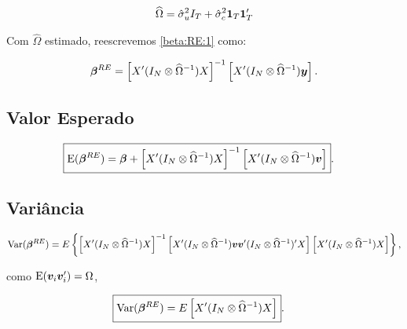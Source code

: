 \documentclass[11pt, oneside, a4paper, article]{article}
\numberwithin{equation}{section}
\begin{document}
\vspace{-1 em}
\begin{align*}
\widehat{\Omega}
= 
\hat{\sigma}^{2}_{u} I_{T} + \hat{\sigma}_{c}^{2} \boldsymbol{1}_{T} \boldsymbol{1}_{T}'
\end{align*}

Com $\widehat{\Omega}$ estimado, reescrevemos \eqref{beta:RE:1} como:

\vspace{-1 em}
\begin{align} \label{beta:RE:2}
\boldsymbol{\beta}^{RE} = 
\left[ X' (I_{N} \otimes \widehat{\Omega}^{-1}) X \right]^{-1}
\left[ X' (I_{N} \otimes \widehat{\Omega}^{-1}) \boldsymbol{y} \right].
\end{align}


\subsection*{Valor Esperado}

\vspace{-1 em}
\begin{align*}
	\Aboxed{
\E( \mbs{\beta}^{RE} ) = 
\mbs{\beta} +
\left[ X' (I_{N} \otimes \widehat{\Omega}^{-1}) X \right]^{-1}
\left[ X' (I_{N} \otimes \widehat{\Omega}^{-1}) \mbs{v} \right] }.
\end{align*}

\subsection*{Variância}

\vspace{-1 em}
\begin{align*} 
\text{Var}( \boldsymbol{\beta}^{RE} ) = 
E
\left\{ 
\left[ X' ( I_{N} \otimes \widehat{\Omega}^{-1} ) X \right]^{-1}
\left[
X' ( I_{N} \otimes \widehat{\Omega}^{-1} )
\boldsymbol{v} \boldsymbol{v}'
( I_{N} \otimes \widehat{\Omega}^{-1} )' X
\right]
\left[ X' ( I_{N} \otimes \widehat{\Omega}^{-1} ) X \right]
\right\},
\end{align*}

\noindent
como $\text{E}( \boldsymbol{v}_{i} \boldsymbol{v}_{i}' ) =\Omega$,

\vspace{-1 em}
\begin{align*} 
	\Aboxed{
\Var( \mbs{\beta}^{RE} ) = 
E
\left[ X' ( I_{N} \otimes \widehat{\Omega}^{-1} ) X \right] }.
\end{align*}
\end{document}
